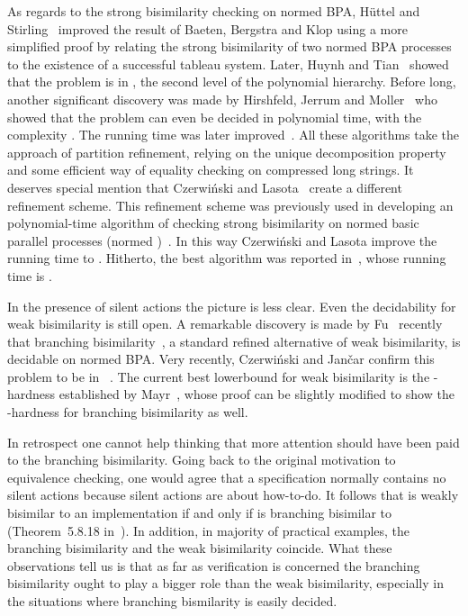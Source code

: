 \documentclass{llncs}
\begin{document}
As regards to the strong bisimilarity checking on normed BPA,
H\"uttel and Stirling~\cite{DBLP:conf/lics/HuttelS91} improved
the result of Baeten, Bergstra and Klop using a more simplified proof by relating
the strong bisimilarity of two normed BPA processes to the existence of a successful
tableau system.  Later, Huynh and Tian~\cite{DBLP:journals/tcs/HuynhT94} showed
that the problem is in , the second level of the polynomial hierarchy.
Before long, another significant discovery was made by Hirshfeld,
Jerrum and Moller~\cite{DBLP:journals/tcs/HirshfeldJM96} who showed that the problem can even be decided in  polynomial
time, with the complexity .
The running time was later improved~\cite{DBLP:conf/mfcs/LasotaR06,DBLP:conf/fsttcs/CzerwinskiL10}. All these algorithms take the approach of partition refinement, relying on the unique decomposition property and some
efficient way of equality checking on compressed long strings.
It deserves special mention that Czerwi\'{n}ski and Lasota~\cite{DBLP:conf/fsttcs/CzerwinskiL10} create a different refinement scheme. This refinement scheme was previously used in developing an polynomial-time algorithm of checking strong bisimilarity on normed basic parallel processes (normed )~\cite{DBLP:journals/mscs/HirshfeldJM96}. In this way  Czerwi\'{n}ski and Lasota improve the running time to .  Hitherto, the best algorithm was reported in~\cite{CzerwinskiPhD}, whose running time is  .

In the presence of silent actions the picture is less clear.  Even the decidability for weak bisimilarity is still open.  A remarkable discovery is made by Fu~\cite{DBLP:conf/icalp/Fu13} recently that branching bisimilarity~\cite{GlabbeekW96}, a standard refined alternative of weak bisimilarity, is decidable on normed BPA. Very recently, Czerwi\'{n}ski and Jan\v{c}ar confirm this problem to be in ~\cite{DBLP:journals/corr/CzerwinskiJ14}.  The current best lowerbound for weak bisimilarity  is the -hardness established by Mayr~\cite{Mayr2005}, whose proof can be slightly modified to show
the -hardness for branching bisimilarity as well.



In retrospect one cannot help thinking that more attention should
have been paid to the branching bisimilarity. Going back to the original motivation
to equivalence checking, one would agree that a specification  normally
contains no silent actions because silent actions are about how-to-do. It follows
that  is weakly bisimilar to an implementation  if and only if  is branching
bisimilar to  (Theorem~5.8.18 in~\cite{Baeten:1991:PA:103272}).  In addition, in majority of practical examples, the branching
bisimilarity and the weak bisimilarity coincide.  What these observations tell us is that as far as verification is
concerned the branching bisimilarity ought to play a bigger role than the weak
bisimilarity, especially in the situations where branching bismilarity is easily decided.
\end{document}
